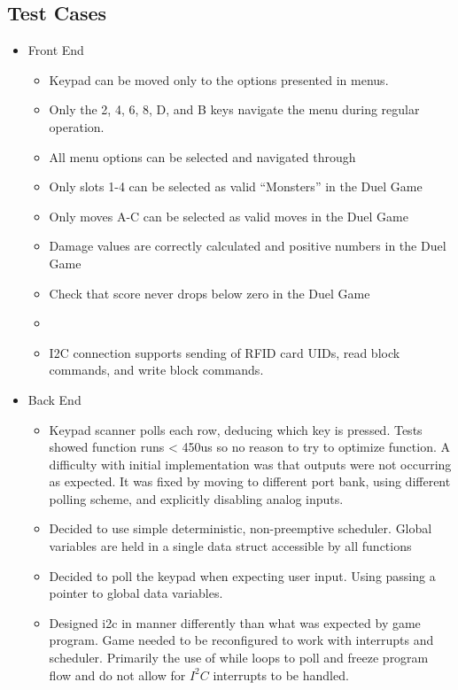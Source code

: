 \documentclass[12pt]{article} %
\begin{document}
\subsection{Test Cases} %
%

\begin{itemize}
	\item Front End
		\begin{itemize}
			\item Keypad can be moved only to the options presented in menus.
			\item Only the 2, 4, 6, 8, D, and B keys navigate the menu during regular operation.
			\item All menu options can be selected and navigated through
			\item Only slots 1-4 can be selected as valid ``Monsters'' in the Duel Game
			\item Only moves A-C can be selected as valid moves in the Duel Game
			\item Damage values are correctly calculated and positive numbers in the Duel Game
			\item Check that score never drops below zero in the Duel Game
			\item 
			\item I2C connection supports sending of RFID card UIDs, read block commands, and write block commands.
			
		\end{itemize}
	\item Back End
			\begin{itemize}
			\item Keypad scanner polls each row, deducing which key is pressed. Tests showed function runs < 450us so no reason to try to optimize function. A difficulty with initial implementation was that outputs were not occurring as expected. It was fixed by moving to different port bank, using different polling scheme, and explicitly disabling analog inputs.
			\item Decided to use simple deterministic, non-preemptive scheduler. Global variables are held in a single data struct accessible by all functions
			\item Decided to poll the keypad when expecting user input. Using passing a pointer to global data variables.
			\item Designed i2c in manner differently than what was expected by game program. Game needed to be reconfigured to work with interrupts and scheduler. Primarily the use of while loops to poll and freeze program flow and do not allow for $I^2C$ interrupts to be handled.
		\end{itemize}
\end{itemize}
\end{document}
